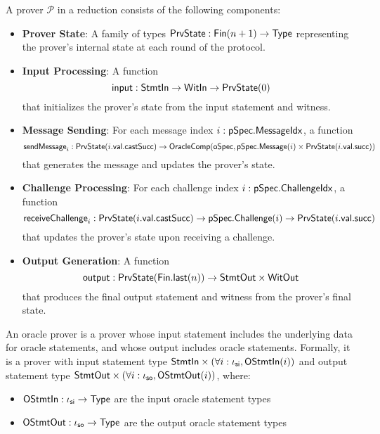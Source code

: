 \begin{definition}
    \label{def:prover}
    A prover $\mathcal{P}$ in a reduction consists of the following components:

    \begin{itemize}
        \item \textbf{Prover State}: A family of types $\mathsf{PrvState} : \mathsf{Fin}(n+1) \to \mathsf{Type}$ representing the prover's internal state at each round of the protocol.

        \item \textbf{Input Processing}: A function
        \[ \mathsf{input} : \mathsf{StmtIn} \to \mathsf{WitIn} \to \mathsf{PrvState}(0) \]
        that initializes the prover's state from the input statement and witness.

        \item \textbf{Message Sending}: For each message index $i : \mathsf{pSpec}.\mathsf{MessageIdx}$, a function
        \[ \mathsf{sendMessage}_i : \mathsf{PrvState}(i.\mathsf{val}.\mathsf{castSucc}) \to \mathsf{OracleComp}(\mathsf{oSpec}, \mathsf{pSpec}.\mathsf{Message}(i) \times \mathsf{PrvState}(i.\mathsf{val}.\mathsf{succ})) \]
        that generates the message and updates the prover's state.

        \item \textbf{Challenge Processing}: For each challenge index $i : \mathsf{pSpec}.\mathsf{ChallengeIdx}$, a function
        \[ \mathsf{receiveChallenge}_i : \mathsf{PrvState}(i.\mathsf{val}.\mathsf{castSucc}) \to \mathsf{pSpec}.\mathsf{Challenge}(i) \to \mathsf{PrvState}(i.\mathsf{val}.\mathsf{succ}) \]
        that updates the prover's state upon receiving a challenge.

        \item \textbf{Output Generation}: A function
        \[ \mathsf{output} : \mathsf{PrvState}(\mathsf{Fin}.\mathsf{last}(n)) \to \mathsf{StmtOut} \times \mathsf{WitOut} \]
        that produces the final output statement and witness from the prover's final state.
    \end{itemize}
\end{definition}

\begin{definition}
    \label{def:oracle_prover}
    An oracle prover is a prover whose input statement includes the underlying data for oracle statements, and whose output includes oracle statements. Formally, it is a prover with input statement type $\mathsf{StmtIn} \times (\forall i : \iota_{\mathsf{si}}, \mathsf{OStmtIn}(i))$ and output statement type $\mathsf{StmtOut} \times (\forall i : \iota_{\mathsf{so}}, \mathsf{OStmtOut}(i))$, where:
    \begin{itemize}
        \item $\mathsf{OStmtIn} : \iota_{\mathsf{si}} \to \mathsf{Type}$ are the input oracle statement types
        \item $\mathsf{OStmtOut} : \iota_{\mathsf{so}} \to \mathsf{Type}$ are the output oracle statement types
    \end{itemize}
\end{definition}

